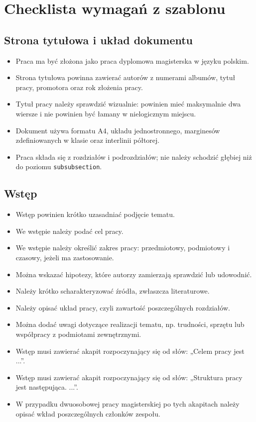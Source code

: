\chapter*{Checklista wymagań z szablonu}

\section*{Strona tytułowa i układ dokumentu}
\begin{itemize}
    \item Praca ma być złożona jako praca dyplomowa magisterska w języku polskim.
    \item Strona tytułowa powinna zawierać autorów z numerami albumów, tytuł pracy, promotora oraz rok złożenia pracy.
    \item Tytuł pracy należy sprawdzić wizualnie: powinien mieć maksymalnie dwa wiersze i nie powinien być łamany w nielogicznym miejscu.
    \item Dokument używa formatu A4, układu jednostronnego, marginesów zdefiniowanych w klasie oraz interlinii półtorej.
    \item Praca składa się z rozdziałów i podrozdziałów; nie należy schodzić głębiej niż do poziomu \texttt{subsubsection}.
\end{itemize}

\section*{Wstęp}
\begin{itemize}
    \item Wstęp powinien krótko uzasadniać podjęcie tematu.
    \item We wstępie należy podać cel pracy.
    \item We wstępie należy określić zakres pracy: przedmiotowy, podmiotowy i czasowy, jeżeli ma zastosowanie.
    \item Można wskazać hipotezy, które autorzy zamierzają sprawdzić lub udowodnić.
    \item Należy krótko scharakteryzować źródła, zwłaszcza literaturowe.
    \item Należy opisać układ pracy, czyli zawartość poszczególnych rozdziałów.
    \item Można dodać uwagi dotyczące realizacji tematu, np. trudności, sprzętu lub współpracy z podmiotami zewnętrznymi.
    \item Wstęp musi zawierać akapit rozpoczynający się od słów: „Celem pracy jest ...”.
    \item Wstęp musi zawierać akapit rozpoczynający się od słów: „Struktura pracy jest następująca. ...”.
    \item W przypadku dwuosobowej pracy magisterskiej po tych akapitach należy opisać wkład poszczególnych członków zespołu.
\end{itemize}

